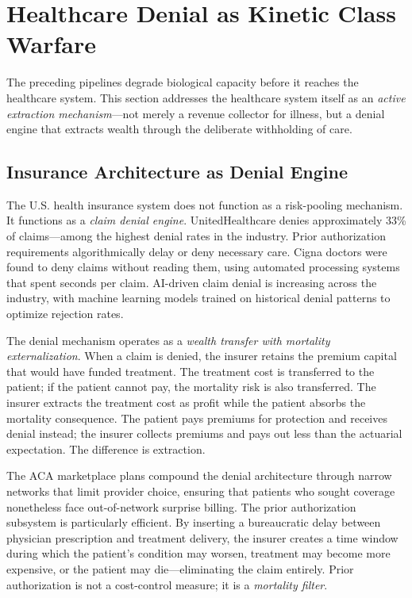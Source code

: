 \section{Healthcare Denial as Kinetic Class Warfare}
\label{sec:healthcare_denial}

The preceding pipelines degrade biological capacity before it reaches the healthcare system. This section addresses the healthcare system itself as an \textit{active extraction mechanism}---not merely a revenue collector for illness, but a denial engine that extracts wealth through the deliberate withholding of care.

\subsection{Insurance Architecture as Denial Engine}

The U.S. health insurance system does not function as a risk-pooling mechanism. It functions as a \textit{claim denial engine}. UnitedHealthcare denies approximately 33\% of claims---among the highest denial rates in the industry. Prior authorization requirements algorithmically delay or deny necessary care. Cigna doctors were found to deny claims without reading them, using automated processing systems that spent seconds per claim. AI-driven claim denial is increasing across the industry, with machine learning models trained on historical denial patterns to optimize rejection rates.

The denial mechanism operates as a \textit{wealth transfer with mortality externalization}. When a claim is denied, the insurer retains the premium capital that would have funded treatment. The treatment cost is transferred to the patient; if the patient cannot pay, the mortality risk is also transferred. The insurer extracts the treatment cost as profit while the patient absorbs the mortality consequence. The patient pays premiums for protection and receives denial instead; the insurer collects premiums and pays out less than the actuarial expectation. The difference is extraction.

The ACA marketplace plans compound the denial architecture through narrow networks that limit provider choice, ensuring that patients who sought coverage nonetheless face out-of-network surprise billing. The prior authorization subsystem is particularly efficient. By inserting a bureaucratic delay between physician prescription and treatment delivery, the insurer creates a time window during which the patient's condition may worsen, treatment may become more expensive, or the patient may die---eliminating the claim entirely. Prior authorization is not a cost-control measure; it is a \textit{mortality filter}.

